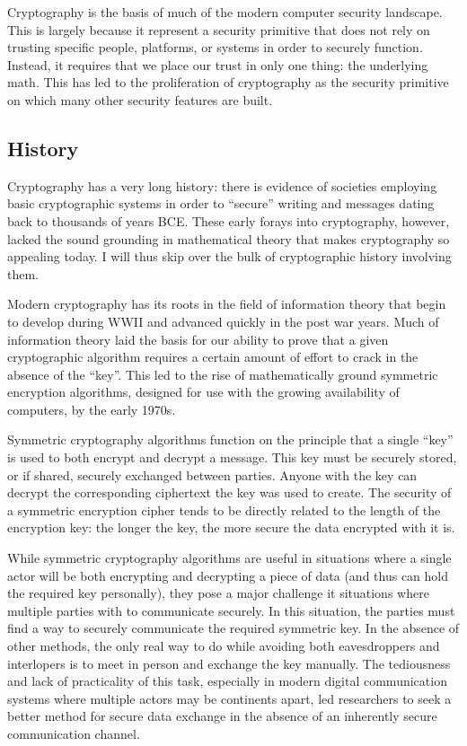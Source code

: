 \documentclass{sig-alternate}
\begin{document}
Cryptography is the basis of much of the modern computer security
landscape. This is largely because it represent a security primitive
that does not rely on trusting specific people, platforms, or systems
in order to securely function. Instead, it requires that we place our
trust in only one thing: the underlying math. This has led to the
proliferation of cryptography as the security primitive on which many
other security features are built.

\subsection{History}

Cryptography has a very long history: there is evidence of societies
employing basic cryptographic systems in order to ``secure'' writing
and messages dating back to thousands of years BCE. These early forays
into cryptography, however, lacked the sound grounding in mathematical
theory that makes cryptography so appealing today. I will thus skip
over the bulk of cryptographic history involving them.

Modern cryptography has its roots in the field of information theory
that begin to develop during WWII and advanced quickly in the post war
years. Much of information theory laid the basis for our ability to
prove that a given cryptographic algorithm requires a certain amount
of effort to crack in the absence of the ``key''. This led to the rise
of mathematically ground symmetric encryption algorithms, designed for
use with the growing availability of computers, by the early 1970s.

Symmetric cryptography algorithms function on the principle that a
single ``key'' is used to both encrypt and decrypt a message. This key
must be securely stored, or if shared, securely exchanged between
parties. Anyone with the key can decrypt the corresponding ciphertext
the key was used to create. The security of a symmetric encryption
cipher tends to be directly related to the length of the encryption
key: the longer the key, the more secure the data encrypted with it
is.

While symmetric cryptography algorithms are useful in situations where
a single actor will be both encrypting and decrypting a piece of data
(and thus can hold the required key personally), they pose a major
challenge it situations where multiple parties with to communicate
securely. In this situation, the parties must find a way to securely
communicate the required symmetric key. In the absence of other
methods, the only real way to do while avoiding both eavesdroppers and
interlopers is to meet in person and exchange the key manually. The
tediousness and lack of practicality of this task, especially in
modern digital communication systems where multiple actors may be
continents apart, led researchers to seek a better method for secure
data exchange in the absence of an inherently secure communication
channel.
\end{document}
